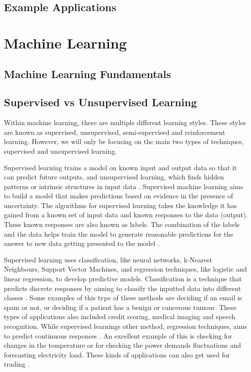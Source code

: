 	\subsection{Example Applications}
	

	\section{Machine Learning}
	
	\subsection{Machine Learning Fundamentals}
	
	
	\subsection{Supervised vs Unsupervised Learning}
	Within machine learning, there are multiple different learning styles. These styles are known as supervised, unsupervised, semi-supervised and reinforcement learning. However, we will only be focusing on the main two types of techniques, supervised and unsupervised learning. 
	
	Supervised learning trains a model on known input and output data so that it can predict future outputs, and unsupervised learning, which finds hidden patterns or intrinsic structures in input data \cite{geron2019hands}. Supervised machine learning aims to build a model that makes predictions based on evidence in the presence of uncertainty. The algorithms for supervised learning takes the knowledge it has gained from a known set of input data and known responses to the data (output). These known responses are also known as labels. The combination of the labels and the data helps train the model to generate reasonable predictions for the answer to new data getting presented to the model \cite{matlanintrotoml, geron2019hands}. 
	
	Supervised learning uses classification, like neural networks, k-Nearest Neighbours, Support Vector Machines, and regression techniques, like logistic and linear regression, to develop predictive models.  Classification is a technique that predicts discrete responses by aiming to classify the inputted data into different classes \cite{matlanintrotoml}. Some examples of this type of these methods are deciding if an email is spam or not, or deciding if a patient has a benign or cancerous tumour. These types of applications also included credit scoring, medical imaging and speech recognition. While supervised learnings other method, regression techniques, aims to predict continuous responses \cite{geron2019hands}. An excellent example of this is checking for changes in the temperature or for checking the power demands fluctuations and forecasting electricity load. These kinds of applications can also get used for trading  \cite{matlanintrotoml}.
	
